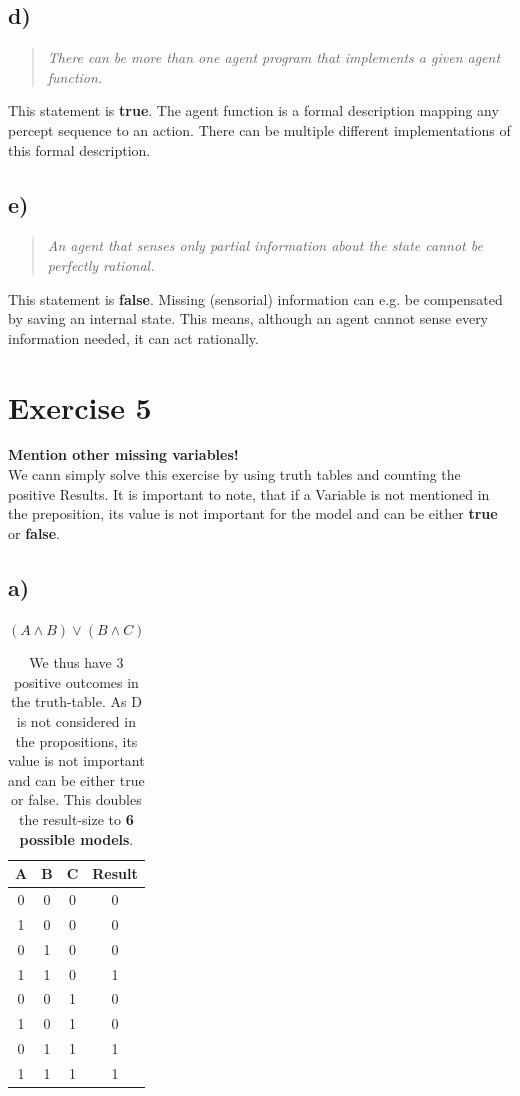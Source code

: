 \documentclass[11pt]{article}
\begin{document}
\subsection*{d)}
\begin{quotation}\noindent
\textit{There can be more than one agent program that implements a given agent function.}
\end{quotation}
\noindent
This statement is \textbf{true}. The agent function is a formal description mapping any percept sequence to an action. There can be multiple different implementations of this formal description.

\subsection*{e)}
\begin{quotation}\noindent
\textit{An agent that senses only partial information about the state cannot be perfectly rational.}
\end{quotation}
\noindent
This statement is \textbf{false}. Missing (sensorial) information can e.g. be compensated by saving an internal state. This means, although an agent cannot sense every information needed, it can act rationally.

\newpage

\section*{Exercise 5}
\textbf{Mention other missing variables!}\\

\noindent We cann simply solve this exercise by using truth tables and counting the positive Results. It is important to note, that if a Variable is not mentioned in the preposition, its value is not important for the model and can be either \textbf{true} or \textbf{false}.

\subsection*{a)} 
$(A \wedge B) \vee (B \wedge C)$
\begin{table}[h]
  \begin{tabular}{c|c|c||c}
    A & B & C & Result\\
    \hline
    0 & 0 & 0 & 0 \\
    1 & 0 & 0 & 0 \\
    0 & 1 & 0 & 0 \\
    1 & 1 & 0 & 1 \\
    0 & 0 & 1 & 0 \\
    1 & 0 & 1 & 0 \\
    0 & 1 & 1 & 1 \\
    1 & 1 & 1 & 1
  \end{tabular}
  \caption*{We thus have 3 positive outcomes in the truth-table. As D is not considered in the propositions, its value is not important and can be either true or false. This doubles the result-size to \textbf{6 possible models}.}
\end{table}
\end{document}
